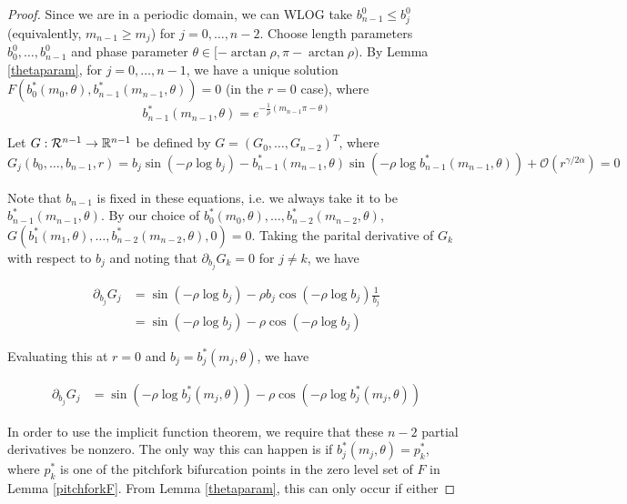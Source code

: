 \documentclass[thesis.tex]{subfiles}
\begin{document}
\begin{theorem}
\begin{proof}
Since we are in a periodic domain, we can WLOG take $b_{n-1}^0 \leq b_j^0$ (equivalently, $m_{n-1} \geq m_j$) for $j = 0, \dots, n-2$. Choose length parameters $b_0^0, \dots, b_{n-1}^0$ and phase parameter $\theta \in [-\arctan \rho, \pi - \arctan \rho)$. By Lemma \ref{thetaparam}, for $j = 0, \dots, n-1$, we have a unique solution $F(b_0^*(m_0, \theta), b_{n-1}^*(m_{n-1}, \theta)) = 0$ (in the $r = 0$ case), where 
\[
b_{n-1}^*(m_{n-1}, \theta) = e^{-\frac{1}{\rho}(m_{n-1}\pi - \theta)}
\]

Let $G: \mathcal{R}^{n-1} \rightarrow {\mathbb R}^{n-1}$ be defined by $G = (G_0, \dots, G_{n-2})^T$, where 
\begin{equation*}
G_j(b_0, \dots, b_{n-1}, r) = b_j \sin \left( -\rho \log b_j \right) - b_{n-1}^*(m_{n-1}, \theta) \sin \left( -\rho \log b_{n-1}^*(m_{n-1}, \theta) \right) + \mathcal{O}(r^{\gamma / 2 \alpha}) = 0
\end{equation*}

Note that $b_{n-1}$ is fixed in these equations, i.e. we always take it to be $b_{n-1}^*(m_{n-1}, \theta)$. By our choice of $b_0^*(m_0, \theta), \dots, b_{n-2}^*(m_{n-2}, \theta)$, $G(b_1^*(m_1, \theta), \dots, b_{n-2}^*(m_{n-2}, \theta), 0) = 0$. Taking the parital derivative of $G_k$ with respect to $b_j$ and noting that $\partial_{b_j} G_k = 0$ for $j \neq k$, we have

\begin{align*}
\partial_{b_j} G_j &= 
\sin \left( -\rho \log b_j \right) - \rho b_j \cos \left( -\rho \log b_j \right) \frac{1}{b_j} \\
&= \sin \left( -\rho \log b_j \right) - \rho \cos \left( -\rho \log b_j \right)
\end{align*}

Evaluating this at $r = 0$ and $b_j = b_j^*(m_j, \theta)$, we have

\begin{align*}
\partial_{b_j} G_j
&= \sin \left( -\rho \log b_j^*(m_j, \theta) \right) - \rho \cos \left( -\rho \log b_j^*(m_j, \theta) \right)
\end{align*}

In order to use the implicit function theorem, we require that these $n-2$ partial derivatives be nonzero. The only way this can happen is if $b_j^*(m_j, \theta) = p_k^*$, where $p_k^*$ is one of the pitchfork bifurcation points in the zero level set of $F$ in Lemma \ref{pitchforkF}. From Lemma \ref{thetaparam}, this can only occur if either


\end{proof}
\end{theorem}
\end{document}
